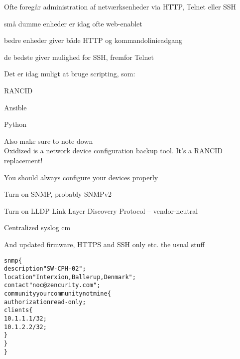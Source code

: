 \documentclass[Screen16to9,17pt]{foils}
\begin{document}

\begin{list1}
\item Ofte foregår administration af netværksenheder via HTTP, Telnet eller SSH
\begin{list2}
\item små dumme enheder er idag ofte web-enablet
\item bedre enheder giver både HTTP og kommandolinieadgang
\item de bedste giver mulighed for SSH, fremfor Telnet
\end{list2}
\item Det er idag muligt at bruge scripting, som:
\begin{list2}
\item RANCID 
\item Ansible 
\item Python
\item Also make sure to note down \\
Oxidized is a network device configuration backup tool. It's a RANCID replacement!
\end{list2}
\end{list1}









\begin{slidelist}
\item You should always configure your devices properly
\item Turn on SNMP, probably SNMPv2
\item Turn on LLDP Link Layer Discovery Protocol -- vendor-neutral\\
{\small{}}
\item Centralized syslog
 cm
\item And updated firmware, HTTPS and SSH only etc. the usual stuff
\end{slidelist}



\begin{alltt}
snmp \{
    description "SW-CPH-02";
    location "Interxion, Ballerup, Denmark";
    contact "noc@zencurity.com";
    community yourcommunitynotmine \{
        authorization read-only;
        clients \{
            10.1.1.1/32;
            10.1.2.2/32;
        \}
    \}
\}
\end{alltt}
\end{document}

